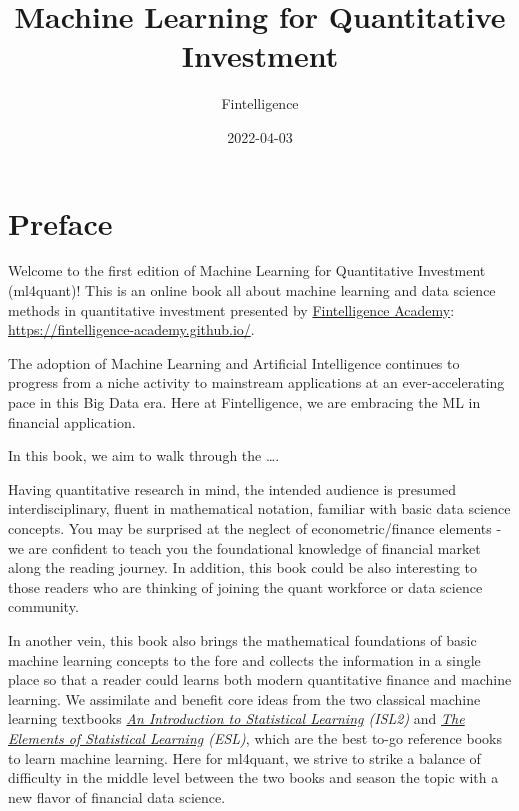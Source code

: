 \documentclass[
]{book}
\title{Machine Learning for Quantitative Investment}
\author{Fintelligence}
\date{2022-04-03}
\begin{document}
\maketitle

{
\setcounter{tocdepth}{1}
\tableofcontents
}
\hypertarget{preface}{%
\chapter*{Preface}\label{preface}}

Welcome to the first edition of {Machine Learning for Quantitative Investment (ml4quant)}! This is an online book all about machine learning and data science methods in quantitative investment presented by \href{https://fintelligence-academy.github.io/}{Fintelligence Academy}: \url{https://fintelligence-academy.github.io/}.

The adoption of Machine Learning and Artificial Intelligence continues to progress from a niche activity to mainstream applications at an ever-accelerating pace in this Big Data era. Here at Fintelligence, we are embracing the ML in financial application.

In this book, we aim to walk through the \ldots.

Having quantitative research in mind, the intended audience is presumed interdisciplinary, fluent in mathematical notation, familiar with basic data science concepts. You may be surprised at the neglect of econometric/finance elements - we are confident to teach you the foundational knowledge of financial market along the reading journey. In addition, this book could be also interesting to those readers who are thinking of joining the quant workforce or data science community.

In another vein, this book also brings the mathematical foundations of basic machine learning concepts to the fore and collects the information in a single place so that a reader could learns both modern quantitative finance and machine learning. We assimilate and benefit core ideas from the two classical machine learning textbooks \emph{\href{https://www.statlearning.com/}{An Introduction to Statistical Learning} (ISL2)} and \emph{\href{https://hastie.su.domains/Papers/ESLII.pdf}{The Elements of Statistical Learning} (ESL)}, which are the best to-go reference books to learn machine learning. Here for ml4quant, we strive to strike a balance of difficulty in the middle level between the two books and season the topic with a new flavor of financial data science.
\end{document}
